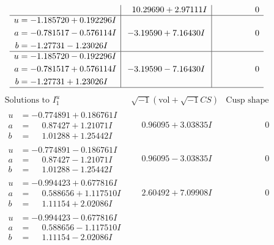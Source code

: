 \documentclass[1p]{elsarticle_modified}
\theoremstyle{definition}
\newcommand{\I}{\sqrt{-1}}
\begin{document}
$$\begin{array}{c|c|c}
 & \phantom{-}10.29690 + 2.97111 I & \phantom{-0.000000 } 0 \\ \hline\begin{aligned}
u &= -1.185720 + 0.192296 I \\
a &= -0.781517 - 0.576114 I \\
b &= -1.27731 - 1.23026 I\end{aligned}
 & -3.19590 + 7.16430 I & \phantom{-0.000000 } 0 \\ \hline\begin{aligned}
u &= -1.185720 - 0.192296 I \\
a &= -0.781517 + 0.576114 I \\
b &= -1.27731 + 1.23026 I\end{aligned}
 & -3.19590 - 7.16430 I & \phantom{-0.000000 } 0\\
 \hline 
 \end{array}$$\newpage$$\begin{array}{c|c|c}  
\text{Solutions to }I^u_{1}& \I (\text{vol} + \sqrt{-1}CS) & \text{Cusp shape}\\
 \hline 
\begin{aligned}
u &= -0.774891 + 0.186761 I \\
a &= \phantom{-}0.87427 + 1.21071 I \\
b &= \phantom{-}1.01288 + 1.25442 I\end{aligned}
 & \phantom{-}0.96095 + 3.03835 I & \phantom{-0.000000 } 0 \\ \hline\begin{aligned}
u &= -0.774891 - 0.186761 I \\
a &= \phantom{-}0.87427 - 1.21071 I \\
b &= \phantom{-}1.01288 - 1.25442 I\end{aligned}
 & \phantom{-}0.96095 - 3.03835 I & \phantom{-0.000000 } 0 \\ \hline\begin{aligned}
u &= -0.994423 + 0.677816 I \\
a &= \phantom{-}0.588656 + 1.117510 I \\
b &= \phantom{-}1.11154 + 2.02086 I\end{aligned}
 & \phantom{-}2.60492 + 7.09908 I & \phantom{-0.000000 } 0 \\ \hline\begin{aligned}
u &= -0.994423 - 0.677816 I \\
a &= \phantom{-}0.588656 - 1.117510 I \\
b &= \phantom{-}1.11154 - 2.02086 I\end{aligned}

\end{array}$$
\end{document}
